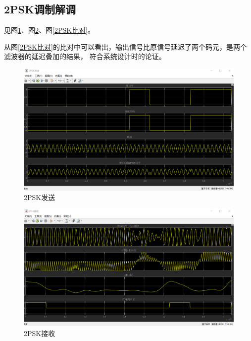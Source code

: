 \documentclass[11pt]{paper}
\begin{document}
\subsection{2PSK调制解调}

见图\ref{2PSK发送}、图\ref{2PSK接收}、图\ref{2PSK比对}。

从图\ref{2PSK比对}的比对中可以看出，输出信号比原信号延迟了两个码元，是两个滤波器的延迟叠加的结果，
符合系统设计时的论证。

\begin{figure}[H]
    \centering
    \includegraphics[width=5.9in]{texture/result/2psk发送结果.png}
    \caption{2PSK发送}
    \label{2PSK发送}
\end{figure}

\begin{figure}[H]
    \centering
    \includegraphics[width=5.9in]{texture/result/2psk接收结果.png}
    \caption{2PSK接收}
    \label{2PSK接收}
\end{figure}
\end{document}
